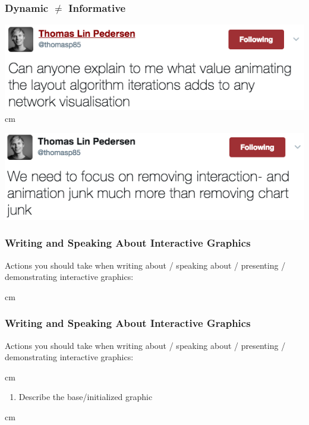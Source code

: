 \documentclass{beamer} %
\begin{document}
\begin{frame}\frametitle{Dynamic $\neq$ Informative}
	\small
	\centering
	
	\includegraphics[width = 0.8\linewidth]{thomasp85-1.png}\\
	
	 cm
	
	\includegraphics[width = 0.8\linewidth]{thomasp85-2.png}\\
	
	
\end{frame}




\begin{frame}\frametitle{Writing and Speaking About Interactive Graphics}
	\small
	
	Actions you should take when writing about / speaking about / presenting / demonstrating interactive graphics:
	
	 cm
	
\end{frame}



\begin{frame}\frametitle{Writing and Speaking About Interactive Graphics}
	\small
	
	Actions you should take when writing about / speaking about / presenting / demonstrating interactive graphics:
	
	 cm
	
	\begin{enumerate}
		\item Describe the base/initialized graphic
	\end{enumerate}
	
	
	 cm
	
\end{frame}
\end{document}
